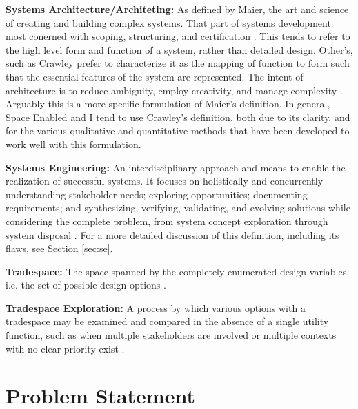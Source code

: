 \documentclass[notitlepage]{article}
\begin{document}
\textbf{Systems Architecture/Architeting:} As defined by Maier, the art and science of creating and building complex systems. That part of systems development most conerned with scoping, structuring, and certification \cite{maierArtSystemsArchitecting2009}. This tends to refer to the high level form and function of a system, rather than detailed design. Other's, such as Crawley prefer to characterize it as the mapping of function to form such that the essential features of the system are represented. The intent of architecture is to reduce ambiguity, employ creativity, and manage complexity \cite{crawleySystemArchitectureStrategy2015}. Arguably this is a more specific formulation of Maier's definition. In general, Space Enabled and I tend to use Crawley's definition, both due to its clarity, and for the various qualitative and quantitative methods that have been developed to work well with this formulation.

\textbf{Systems Engineering:} An interdisciplinary approach and means to enable the realization of successful systems. It focuses on holistically and concurrently understanding stakeholder needs; exploring opportunities; documenting requirements; and synthesizing, verifying, validating, and evolving solutions while considering the complete problem, from system concept exploration through system disposal \cite{systemsengineeringbodyofknowledgeSystemsEngineeringGlossary2021}. 
For a more detailed discussion of this definition, including its flaws, see Section \ref{sec:se}.

\textbf{Tradespace:}  The space spanned by the completely enumerated design variables, i.e. the set of possible design options \cite{rossTradespaceExplorationParadigm2005}.

\textbf{Tradespace Exploration:} A process by which various options with a tradespace may be examined and compared in the absence of a single utility function, such as when multiple stakeholders are involved or multiple contexts with no clear priority exist \cite{rossTradespaceExplorationParadigm2005}.


\section{Problem Statement}
\end{document}
